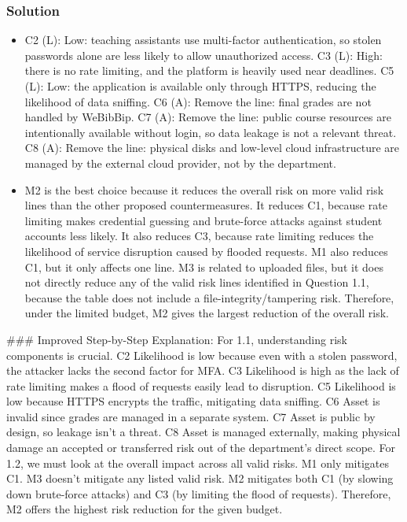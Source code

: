 \documentclass{article}
\begin{document}
\subsubsection*{Solution}
\begin{itemize}
    \item[\textbf{1.1}] C2 (L): Low: teaching assistants use multi-factor authentication, so stolen passwords alone are less likely to allow unauthorized access. C3 (L): High: there is no rate limiting, and the platform is heavily used near deadlines. C5 (L): Low: the application is available only through HTTPS, reducing the likelihood of data sniffing. C6 (A): Remove the line: final grades are not handled by WeBibBip. C7 (A): Remove the line: public course resources are intentionally available without login, so data leakage is not a relevant threat. C8 (A): Remove the line: physical disks and low-level cloud infrastructure are managed by the external cloud provider, not by the department.
    \item[\textbf{1.2}] M2 is the best choice because it reduces the overall risk on more valid risk lines than the other proposed countermeasures. It reduces C1, because rate limiting makes credential guessing and brute-force attacks against student accounts less likely. It also reduces C3, because rate limiting reduces the likelihood of service disruption caused by flooded requests. M1 also reduces C1, but it only affects one line. M3 is related to uploaded files, but it does not directly reduce any of the valid risk lines identified in Question 1.1, because the table does not include a file-integrity/tampering risk. Therefore, under the limited budget, M2 gives the largest reduction of the overall risk.

\end{itemize}
\#\#\# Improved Step-by-Step Explanation:
For 1.1, understanding risk components is crucial. C2 Likelihood is low because even with a stolen password, the attacker lacks the second factor for MFA. C3 Likelihood is high as the lack of rate limiting makes a flood of requests easily lead to disruption. C5 Likelihood is low because HTTPS encrypts the traffic, mitigating data sniffing. C6 Asset is invalid since grades are managed in a separate system. C7 Asset is public by design, so leakage isn't a threat. C8 Asset is managed externally, making physical damage an accepted or transferred risk out of the department's direct scope.
For 1.2, we must look at the overall impact across all valid risks. M1 only mitigates C1. M3 doesn't mitigate any listed valid risk. M2 mitigates both C1 (by slowing down brute-force attacks) and C3 (by limiting the flood of requests). Therefore, M2 offers the highest risk reduction for the given budget.
\end{document}
